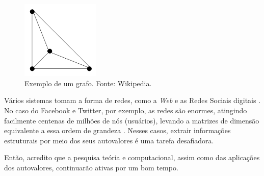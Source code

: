 	\begin{figure}[htbp]
		\centering
			\includegraphics[width=0.33\textwidth]{figs/intro/grafo.PNG}
		\caption{Exemplo de um grafo. Fonte: Wikipedia.}
		\label{fig:grafo}
	\end{figure}
	
	Vários sistemas tomam a forma de redes, como a \emph{Web} e as Redes Sociais digitais \cite{Newman2003}. No caso do Facebook e Twitter, por exemplo, as redes são enormes, atingindo facilmente centenas de milhões de nós (usuários), levando a matrizes de dimensão equivalente a essa ordem de grandeza \cite{twitter2010}. Nesses casos, extrair informações estruturais por meio dos seus autovalores é uma tarefa desafiadora.
	
	Então, acredito que a pesquisa teória e computacional, assim como das aplicações dos autovalores, continuarão ativas por um bom tempo.
